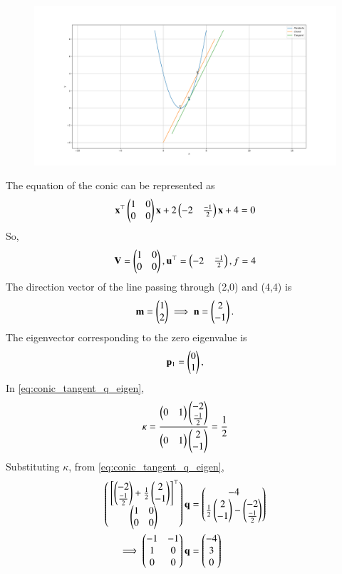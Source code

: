 	\begin{figure}[!ht]
		\centering
 \includegraphics[width=\columnwidth]{chapters/12/6/3/8/figs/main.png}
		\caption{}
		\label{fig:12/6/3/8}
  	\end{figure}
The equation of the conic can be represented as
\begin{align}
\mathbf{x}^{\top}\begin{pmatrix}1&0\\0&0\end{pmatrix}\mathbf{x}+2\begin{pmatrix}-2&\frac{-1}{2}\end{pmatrix}\mathbf{x}+4=0
\end{align}
So,
\begin{align}
\mathbf{V}=\begin{pmatrix}1&0\\0&0\end{pmatrix},
\mathbf{u}^{\top}=\begin{pmatrix}-2&\frac{-1}{2}\end{pmatrix},
f=4
\end{align}
The direction vector of the line passing through (2,0) and (4,4) is 
\begin{align}
\mathbf{m}=\begin{pmatrix}1\\2\end{pmatrix}
\implies
\mathbf{n}=\begin{pmatrix}2\\-1\end{pmatrix}.
\end{align}
The eigenvector corresponding to the zero eigenvalue is 
\begin{align}
\mathbf{p}_1=\begin{pmatrix}0\\1\end{pmatrix},
\end{align}
In
\eqref{eq:conic_tangent_q_eigen},
\begin{align}
	\kappa=\frac{\begin{pmatrix}0&1\end{pmatrix}\begin{pmatrix}-2\\ \frac{-1}{2}\end{pmatrix}}{\begin{pmatrix}0&1\end{pmatrix}\begin{pmatrix}2\\-1\end{pmatrix}}
	=\frac{1}{2}
\end{align}
Substituting  $\kappa$,
from 
\eqref{eq:conic_tangent_q_eigen},
\begin{align}
	\begin{pmatrix}{}\left[\begin{pmatrix}-2\\\frac{-1}{2}\end{pmatrix}+\frac{1}{2}\begin{pmatrix}2\\-1\end{pmatrix}\right]^{\top} \\ \begin{pmatrix}1&0\\0&0\end{pmatrix}\end{pmatrix}\mathbf{q} &= \begin{pmatrix}-4 \\ \frac{1}{2}\begin{pmatrix}2\\-1\end{pmatrix}-\begin{pmatrix}-2\\\frac{-1}{2}\end{pmatrix}\end{pmatrix}\\
	\implies
	\begin{pmatrix}-1&-1 \\ 1&0 \\ 0&0\end{pmatrix}\mathbf{q}&=\begin{pmatrix}-4 \\ 3 \\ 0\end{pmatrix}
\end{align}
